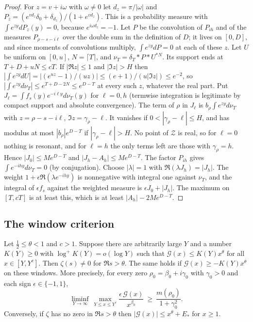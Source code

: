 \begin{proof}
For $z=v+i\omega$ with $\omega\ne0$ let $d_z=\pi/|\omega|$ and $P_z=(e^{vd_z}\delta_0+\delta_{d_z})/(1+e^{vd_z})$. This is a probability measure with $\int e^{zy}dP_z(y)=0$, because $e^{i\omega d_z}=-1$. Let $P$ be the convolution of $P_{ih}$ and of the measures $P_{\rho-s-i\ell}$ over the double sum in the definition of $D$; it lives on $[0,D]$, and since moments of convolutions multiply, $\int e^{zy}dP=0$ at each of these $z$. Let $U$ be uniform on $[0,u]$, $N=\lceil T\rceil$, and $\nu_T=\delta_T*P*U^{*N}$. Its support ends at $T+D+uN\le cT$. If $|\Re z|\le1$ and $|\Im z|>H$ then $|\int e^{zy}dU|=|(e^{uz}-1)/(uz)|\le(e+1)/(u|\Im z|)\le e^{-2}$, so $|\int e^{zy}d\nu_T|\le e^{T+D-2N}\le e^{D-T}$ at every such $z$, whatever the real part. Put $J_\ell=\int f_s(y)e^{-i\ell y}d\nu_T(y)$ for $\ell=0,h$ (termwise integration is legitimate by compact support and absolute convergence). The term of $\rho$ in $J_\ell$ is $b_\rho\int e^{zy}d\nu_T$ with $z=\rho-s-i\ell$, $\Im z=\gamma_\rho-\ell$. It vanishes if $0<|\gamma_\rho-\ell|\le H$, and has modulus at most $|b_\rho|e^{D-T}$ if $|\gamma_\rho-\ell|>H$. No point of $\mathcal Z$ is real, so for $\ell=0$ nothing is resonant, and for $\ell=h$ the only terms left are those with $\gamma_\rho=h$. Hence $|J_0|\le Me^{D-T}$ and $|J_h-A_h|\le Me^{D-T}$. The factor $P_{ih}$ gives $\int e^{-ihy}d\nu_T=0$ (by conjugation). Choose $|\lambda|=1$ with $\Re(\lambda J_h)=|J_h|$. The weight $1+\epsilon\Re(\lambda e^{-ihy})$ is nonnegative with integral one against $\nu_T$, and the integral of $\epsilon f_s$ against the weighted measure is $\epsilon J_0+|J_h|$. The maximum on $[T,cT]$ is at least this, which is at least $|A_h|-2Me^{D-T}$.
\end{proof}

\subsection{The window criterion}

\begin{theorem}\label{mq:thm:window}
Let $\frac12\le\theta<1$ and $c>1$. Suppose there are arbitrarily large $Y$ and a number $K(Y)\ge0$ with $\log^+K(Y)=o(\log Y)$ such that $\mathcal G(x)\le K(Y)x^\theta$ for all $x\in[Y,Y^c]$. Then $\zeta(s)\ne0$ for $\Re s>\theta$. The same holds if $\mathcal G(x)\ge-K(Y)x^\theta$ on these windows. More precisely, for every zero $\rho_0=\beta_0+i\gamma_0$ with $\gamma_0>0$ and each sign $\epsilon\in\{-1,1\}$,
\[
\liminf_{Y\to\infty}\ \max_{Y\le x\le Y^c}\frac{\epsilon\,\mathcal G(x)}{x^{\beta_0}}\ \ge\ \frac{m(\rho_0)}{1+\gamma_0^2}.
\]
Conversely, if $\zeta$ has no zero in $\Re s>\theta$ then $|\mathcal G(x)|\le x^\theta+E_*$ for $x\ge1$.
\end{theorem}

